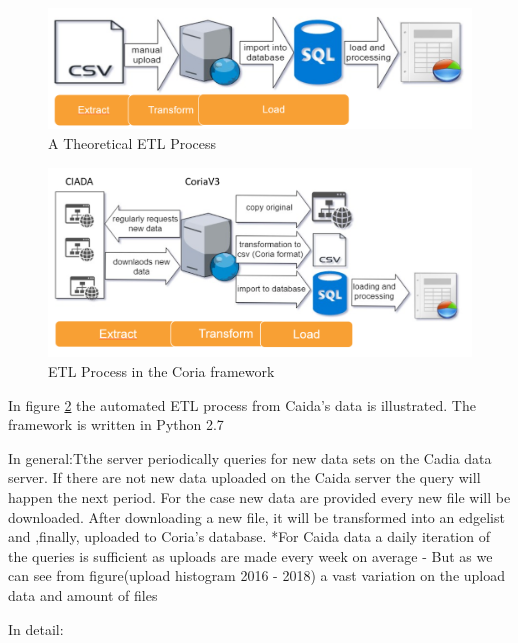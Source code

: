 \documentclass[conference, 11pt]{IEEEtran}
\begin{document}
\begin{figure}[htbp]
\centerline{\includegraphics[scale=0.29]{Graphics/ETL1.PNG}}
\caption{A Theoretical ETL Process}
\label{fig}
\end{figure}



\begin{figure}[htbp]
\centerline{\includegraphics[scale=0.4]{Graphics/ETL2.PNG}}
\caption{ETL Process in the Coria framework}
\label{fig:1}
\end{figure}

In figure \ref{fig:1} the automated ETL process from Caida's data is illustrated. The framework is written in Python 2.7 %

In general:Tthe server periodically queries for new data sets on the Cadia data server. If there are not new data uploaded on the Caida server the query will happen the next period. 
For the case new data are provided every new file will be downloaded. After downloading a new file, it will be transformed into an edgelist and ,finally, uploaded to Coria's database.
\linebreak
\linebreak
*For Caida data a daily iteration of the queries is sufficient as uploads are made every week on average - But as we can see from figure(upload histogram 2016 - 2018) a vast variation on the upload data and amount of files 

In detail:
\end{document}
